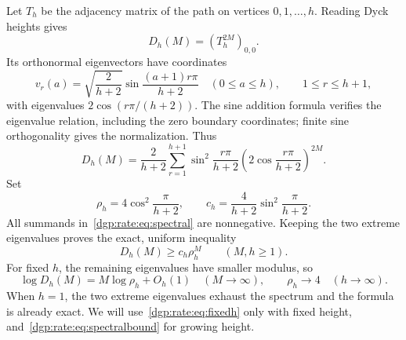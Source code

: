 \documentclass[11pt,letterpaper]{article}
\numberwithin{equation}{section}
\theoremstyle{remark}\newtheorem{remark}[theorem]{Remark}
\begin{document}
Let $T_h$ be the adjacency matrix of the path on vertices $0,1,\ldots,h$.
Reading Dyck heights gives
\begin{equation}\label{dgp:rate:eq:matrix}
 D_h(M)=(T_h^{2M})_{0,0}.
\end{equation}
Its orthonormal eigenvectors have coordinates
\[
 v_r(a)=\sqrt{\frac2{h+2}}\sin\frac{(a+1)r\pi}{h+2}
 \quad(0\leq a\leq h),\qquad 1\leq r\leq h+1,
\]
with eigenvalues $2\cos(r\pi/(h+2))$. The sine addition formula verifies
the eigenvalue relation, including the zero boundary coordinates;
finite sine orthogonality gives the normalization. Thus
\begin{equation}\label{dgp:rate:eq:spectral}
 D_h(M)=\frac2{h+2}\sum_{r=1}^{h+1}
 \sin^2\frac{r\pi}{h+2}
 \left(2\cos\frac{r\pi}{h+2}\right)^{2M}.
\end{equation}
Set
\begin{equation}\label{dgp:rate:eq:rho}
 \rho_h=4\cos^2\frac\pi{h+2},\qquad
 c_h=\frac4{h+2}\sin^2\frac\pi{h+2}.
\end{equation}
All summands in~\eqref{dgp:rate:eq:spectral} are nonnegative. Keeping the two
extreme eigenvalues proves the exact, uniform inequality
\begin{equation}\label{dgp:rate:eq:spectralbound}
 D_h(M)\geq c_h\rho_h^M\qquad(M,h\geq1).
\end{equation}
For fixed $h$, the remaining eigenvalues have smaller modulus, so
\begin{equation}\label{dgp:rate:eq:fixedh}
 \log D_h(M)=M\log\rho_h+O_h(1)\quad(M\to\infty),\qquad
 \rho_h\longrightarrow4\quad(h\to\infty).
\end{equation}
When $h=1$, the two extreme eigenvalues exhaust the spectrum and the
formula is already exact. We will use~\eqref{dgp:rate:eq:fixedh} only with fixed
height, and~\eqref{dgp:rate:eq:spectralbound} for growing height.
\end{document}
